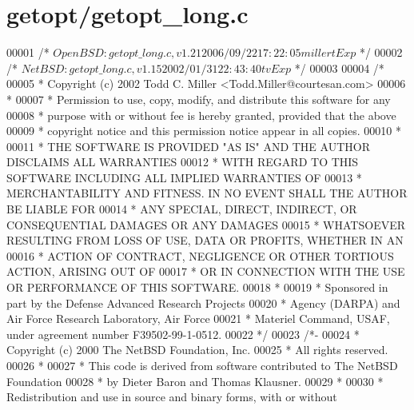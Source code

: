 \hypertarget{getopt_2getopt__long_8c_source}{}\section{getopt/getopt\+\_\+long.c}
\label{getopt_2getopt__long_8c_source}

\begin{DoxyCode}
00001 \textcolor{comment}{/*  $OpenBSD: getopt\_long.c,v 1.21 2006/09/22 17:22:05 millert Exp $    */}
00002 \textcolor{comment}{/*  $NetBSD: getopt\_long.c,v 1.15 2002/01/31 22:43:40 tv Exp $  */}
00003 
00004 \textcolor{comment}{/*}
00005 \textcolor{comment}{ * Copyright (c) 2002 Todd C. Miller <Todd.Miller@courtesan.com>}
00006 \textcolor{comment}{ *}
00007 \textcolor{comment}{ * Permission to use, copy, modify, and distribute this software for any}
00008 \textcolor{comment}{ * purpose with or without fee is hereby granted, provided that the above}
00009 \textcolor{comment}{ * copyright notice and this permission notice appear in all copies.}
00010 \textcolor{comment}{ *}
00011 \textcolor{comment}{ * THE SOFTWARE IS PROVIDED "AS IS" AND THE AUTHOR DISCLAIMS ALL WARRANTIES}
00012 \textcolor{comment}{ * WITH REGARD TO THIS SOFTWARE INCLUDING ALL IMPLIED WARRANTIES OF}
00013 \textcolor{comment}{ * MERCHANTABILITY AND FITNESS. IN NO EVENT SHALL THE AUTHOR BE LIABLE FOR}
00014 \textcolor{comment}{ * ANY SPECIAL, DIRECT, INDIRECT, OR CONSEQUENTIAL DAMAGES OR ANY DAMAGES}
00015 \textcolor{comment}{ * WHATSOEVER RESULTING FROM LOSS OF USE, DATA OR PROFITS, WHETHER IN AN}
00016 \textcolor{comment}{ * ACTION OF CONTRACT, NEGLIGENCE OR OTHER TORTIOUS ACTION, ARISING OUT OF}
00017 \textcolor{comment}{ * OR IN CONNECTION WITH THE USE OR PERFORMANCE OF THIS SOFTWARE.}
00018 \textcolor{comment}{ *}
00019 \textcolor{comment}{ * Sponsored in part by the Defense Advanced Research Projects}
00020 \textcolor{comment}{ * Agency (DARPA) and Air Force Research Laboratory, Air Force}
00021 \textcolor{comment}{ * Materiel Command, USAF, under agreement number F39502-99-1-0512.}
00022 \textcolor{comment}{ */}
00023 \textcolor{comment}{/*-}
00024 \textcolor{comment}{ * Copyright (c) 2000 The NetBSD Foundation, Inc.}
00025 \textcolor{comment}{ * All rights reserved.}
00026 \textcolor{comment}{ *}
00027 \textcolor{comment}{ * This code is derived from software contributed to The NetBSD Foundation}
00028 \textcolor{comment}{ * by Dieter Baron and Thomas Klausner.}
00029 \textcolor{comment}{ *}
00030 \textcolor{comment}{ * Redistribution and use in source and binary forms, with or without}

\end{DoxyCode}
